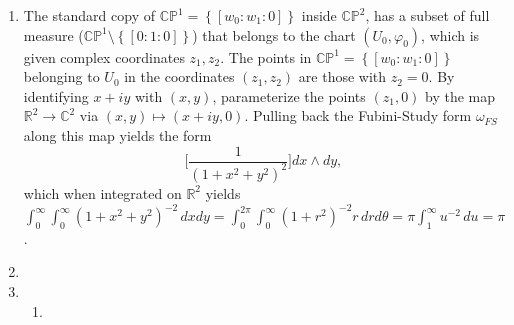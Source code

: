 \documentclass[11pt,leqno]{article}
\theoremstyle{plain}
\theoremstyle{definition}
\numberwithin{equation}{section}
\numberwithin{lem}{section}
\newcommand{\cbr}[1]{\left\{#1\right\}}
\begin{document}
\begin{enumerate}
    Via the spherical change of coordinates $\varpi^{-1}\colon \mathbb R^2\to\mathbb R^3$ given by $(\varphi,\theta)\mapsto (\cos(\theta)\sin(\varphi), \sin(\theta)\sin(\varphi), \cos(\varphi))$ (this is orientation-preserving), the subset of $S^2$ missed by the image of $\varpi^{-1}$ is a half-meridian with boundary the north and south poles of $S^2$, which has measure zero. Then $\int_{S^2}(x dy \wedge dz + y dz \wedge dx + z dx \wedge dy) = \int_0^{2\pi}\int_0^\pi [\cos^2(\theta)\sin^3(\varphi) + \sin^2(\theta)\sin^3(\varphi) + \sin(\varphi)\cos^2(\varphi)] \,d\varphi d\theta = 2\pi\int_0^\pi\sin(\varphi)\,d\varphi = 4\pi$.
    \item The standard copy of $\mathbb{CP}^1 = \cbr{[w_0:w_1:0]}$ inside $\mathbb{CP}^2$, has a subset of full measure ($\mathbb{CP}^1\setminus\cbr{[0:1:0]}$) that belongs to the chart $(U_0,\varphi_0)$, which is given complex coordinates $z_1,z_2$. The points in $\mathbb{CP}^1 = \cbr{[w_0:w_1:0]}$ belonging to $U_0$ in the coordinates $(z_1,z_2)$ are those with $z_2 = 0$. By identifying $x+iy$ with $(x,y)$, parameterize the points $(z_1,0)$ by the map $\mathbb R^2\to \mathbb C^2$ via $(x,y)\mapsto (x+iy,0)$. Pulling back the Fubini-Study form $\omega_{FS}$ along this map yields the form
    \[\bigg[\frac{1}{(1+x^2+y^2)^2}\bigg]dx\wedge dy,\]
    which when integrated on $\mathbb R^2$ yields $\int_0^\infty\int_0^\infty (1+x^2+y^2)^{-2} \,dxdy = \int_0^{2\pi}\int_0^\infty (1+r^2)^{-2}r\,drd\theta = \pi\int_1^\infty u^{-2}\, du = \pi$.
    \item 
    \item \begin{enumerate}
      \item 
      

\end{enumerate}
\end{enumerate}
\end{document}
